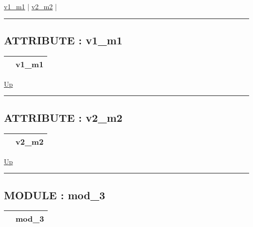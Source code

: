 \par


\hyperlink{ecldoc:example_2.mod_2.v1_m1}{v1\_m1}  |
\hyperlink{ecldoc:example_2.mod_2.v2_m2}{v2\_m2}  |

\rule{\textwidth}{0.4pt}

\subsection*{ATTRIBUTE : v1\_m1}
\hypertarget{ecldoc:example_2.mod_2.v1_m1}{}

{\renewcommand{\arraystretch}{1.5}
\begin{tabularx}{\textwidth}{|>{\raggedright\arraybackslash}l|X|}
\hline
\hspace{0pt} & v1\_m1 \\
\hline
\end{tabularx}
}

\hyperlink{ecldoc:example_2.mod_2}{Up}

\par


\rule{\textwidth}{0.4pt}
\subsection*{ATTRIBUTE : v2\_m2}
\hypertarget{ecldoc:example_2.mod_2.v2_m2}{}

{\renewcommand{\arraystretch}{1.5}
\begin{tabularx}{\textwidth}{|>{\raggedright\arraybackslash}l|X|}
\hline
\hspace{0pt} & v2\_m2 \\
\hline
\end{tabularx}
}

\hyperlink{ecldoc:example_2.mod_2}{Up}

\par


\rule{\textwidth}{0.4pt}


\subsection*{MODULE : mod\_3}
\hypertarget{ecldoc:example_2.mod_3}{}

{\renewcommand{\arraystretch}{1.5}
\begin{tabularx}{\textwidth}{|>{\raggedright\arraybackslash}l|X|}
\hline
\hspace{0pt} & mod\_3 \\
\hline
\end{tabularx}
}

